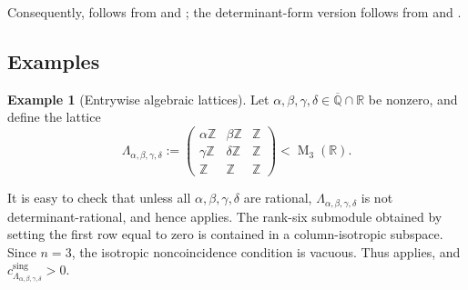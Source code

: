 \documentclass[reqno,11pt]{amsart}
\numberwithin{equation}{section}
\theoremstyle{definition}
\newtheorem{example}[theorem]{Example}
\theoremstyle{remark}
\newcommand{\op}{\operatorname}
\newcommand{\M}{\op{M}}
\begin{document}
Consequently,  follows from  and
; the determinant-form version
follows from  and
.

\subsection{Examples}\label{sub:ex}

\begin{example}[Entrywise algebraic lattices]
Let $\alpha,\beta,\gamma,\delta\in
\overline{\mathbb Q}\cap\mathbb R$ be nonzero, and define the lattice
$$
\Lambda_{\alpha,\beta,\gamma,\delta}
:=
\begin{pmatrix}
\alpha\mathbb Z&\beta\mathbb Z&\mathbb Z\\
\gamma\mathbb Z&\delta\mathbb Z&\mathbb Z\\
\mathbb Z&\mathbb Z&\mathbb Z
\end{pmatrix}
<\M_3(\mathbb R).
$$

It is easy to check that unless all $\alpha,\beta,\gamma,\delta$ are rational,
$\Lambda_{\alpha,\beta,\gamma,\delta}$ is not determinant-rational, and
hence  applies. 
The rank-six submodule obtained by setting the first row equal to zero is
contained in a column-isotropic subspace. Since $n=3$, the
isotropic noncoincidence condition is vacuous. Thus
 applies, and
$c_{\Lambda_{\alpha,\beta,\gamma,\delta}}^{\operatorname{sing}}>0$.
\end{example}
\end{document}
